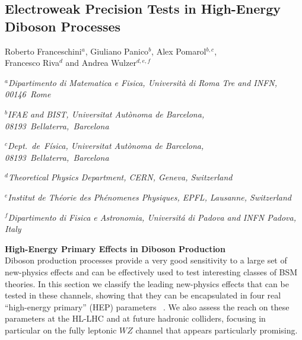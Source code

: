 \documentclass[../report.tex]{subfiles}
\begin{document}
\subsection{ Electroweak Precision Tests  in High-Energy Diboson Processes} 
\begin{center}
\bigskip\vspace{1cm}
{Roberto Franceschini$^{a}$,  Giuliano Panico$^{b}$,  Alex Pomarol$^{b,c}$,\\
  Francesco Riva$^d$  and Andrea Wulzer$^{d,e,f}$}
\centerline{$^a${\it Dipartimento di Matematica e Fisica, Universit\`a di Roma Tre and INFN, 
00146~Rome}}
\centerline{$^b${\it \small IFAE and BIST, Universitat Aut\`onoma de Barcelona, 08193~Bellaterra,~Barcelona}}
\centerline{$^c${\it \small Dept.~de~F\'isica, Universitat Aut{\`o}noma de Barcelona, 08193~Bellaterra,~Barcelona}}
\centerline{$^d${\it\small Theoretical Physics Department, CERN, Geneva, Switzerland}}
\centerline{$^e${\it \small Institut de Th\'eorie des Ph\'enomenes Physiques, EPFL, Lausanne, Switzerland}}
\centerline{$^f${\it \small Dipartimento di Fisica e Astronomia, Universit\'a di Padova and INFN Padova, Italy}}
\end{center}

\noindent
{\bf High-Energy Primary Effects in Diboson Production}\\
Diboson production processes provide a very good sensitivity to a large set of new-physics effects and can be effectively used
to test interesting classes of BSM theories. In this section we classify the leading new-physics effects that can be tested
in these channels, showing that they can be encapsulated in four real ``high-energy primary'' (HEP) parameters~\cite{Franceschini:2017ab} .
We also assess the reach on these parameters at the HL-LHC and at future hadronic colliders, focusing in particular
on the fully leptonic $WZ$ channel that appears particularly promising.
\end{document}
